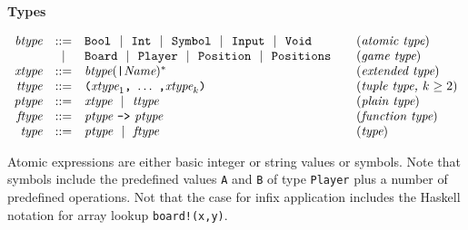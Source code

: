 \documentclass[11pt]{article}
\makeatletter
\newcommand{\prodName}[1]{&(\emph{#1})\\}
\newcommand{\nt}[1]{\textit{#1}}
\newcommand{\prog}[1]{\texttt{#1}}
\newcommand{\ORil}{\ \ |\ \ }
\newcommand{\IS}{&::=&}
\newcommand{\OR}{&|&}
\newcommand{\syntax}[2]{
  \needspace{3\baselineskip}
  \bigskip\par\noindent\textbf{#1}\par\smallskip%
  $\begin{array}{rcl@{\qquad}l}#2\end{array}$%
  \par\bigskip\noindent\ignorespaces
}
\newcommand{\lp}{\prog{(}}
\newcommand{\rp}{\prog{)}}
\newcommand{\paren}[1]{\lp#1\rp}
\makeatother
\begin{document}
\syntax{Types}{
\nt{btype}    \IS  \prog{Bool} \ORil \prog{Int} \ORil
                   \prog{Symbol} \ORil \prog{Input} \ORil \prog{Void}
                                                         \prodName{atomic type}
              \OR  \prog{Board} \ORil \prog{Player} \ORil
                   \prog{Position} \ORil \prog{Positions}
                                                           \prodName{game type}
\nt{xtype}    \IS  \nt{btype}(\prog{|}\nt{Name})^*
                                                       \prodName{extended type}
\nt{ttype}    \IS  \paren{\nt{xtype}_1\prog{,}\ \ldots\ \prog{,}\nt{xtype}_k}
                                               \prodName{tuple type, $k\geq 2$}
\nt{ptype}     \IS  \nt{xtype} \ORil \nt{ttype}
                                                          \prodName{plain type}
\nt{ftype}    \IS  \nt{ptype}\ \prog{->}\ \nt{ptype}   \prodName{function type}
\nt{type}     \IS  \nt{ptype} \ORil \nt{ftype}
                                                                \prodName{type}
}
%
Atomic expressions are either basic integer or string values or symbols. Note
that symbols include the predefined values \prog{A} and \prog{B} of type
\prog{Player} plus a number of predefined operations.
%
Not that the case for infix application includes the Haskell notation for array
lookup \prog{board!(x,y)}.
\end{document}
